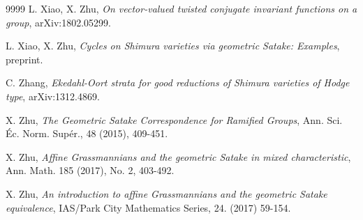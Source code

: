 \begin{thebibliography}{9999}
L. Xiao, X. Zhu, \emph{On vector-valued twisted conjugate invariant functions on a group}, arXiv:1802.05299.

L. Xiao, X. Zhu, \emph{Cycles on Shimura varieties via geometric Satake: Examples}, preprint.

 C. Zhang, \emph{Ekedahl-Oort strata for good reductions of Shimura varieties of Hodge type}, arXiv:1312.4869.

X. Zhu, \emph{The Geometric Satake Correspondence for Ramified Groups}, Ann. Sci. \'Ec. Norm. Sup\'er., 48 (2015), 409-451.

X. Zhu, \emph{Affine Grassmannians and the geometric Satake in mixed characteristic}, Ann. Math. 185 (2017), No. 2, 403-492.

X. Zhu, \emph{An introduction to affine Grassmannians and the geometric Satake equivalence}, IAS/Park City Mathematics Series, 24. (2017) 59-154.

\end{thebibliography}
